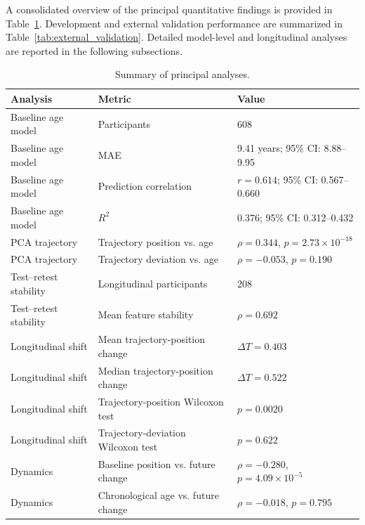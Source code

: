 \documentclass[journal]{IEEEtran}
\begin{document}
A consolidated overview of the principal quantitative findings is provided in Table~\ref{tab:main_findings}. Development and external validation performance are summarized in Table~\ref{tab:external_validation}. Detailed model-level and longitudinal analyses are reported in the following subsections.

\begin{table}[!t]
\centering
\caption{Summary of principal analyses.}
\label{tab:main_findings}
\footnotesize
\begin{tabular}{lll}
\toprule
Analysis & Metric & Value \\
\midrule
Baseline age model & Participants & 608 \\
Baseline age model & MAE & 9.41 years; 95\% CI: 8.88--9.95 \\
Baseline age model & Prediction correlation & $r=0.614$; 95\% CI: 0.567--0.660 \\
Baseline age model & $R^2$ & 0.376; 95\% CI: 0.312--0.432 \\
PCA trajectory & Trajectory position vs. age & $\rho=0.344$, $p=2.73\times10^{-18}$ \\
PCA trajectory & Trajectory deviation vs. age & $\rho=-0.053$, $p=0.190$ \\
Test--retest stability & Longitudinal participants & 208 \\
Test--retest stability & Mean feature stability & $\rho=0.692$ \\
Longitudinal shift & Mean trajectory-position change & $\Delta T=0.403$ \\
Longitudinal shift & Median trajectory-position change & $\Delta T=0.522$ \\
Longitudinal shift & Trajectory-position Wilcoxon test & $p=0.0020$ \\
Longitudinal shift & Trajectory-deviation Wilcoxon test & $p=0.622$ \\
Dynamics & Baseline position vs. future change & $\rho=-0.280$, $p=4.09\times10^{-5}$ \\
Dynamics & Chronological age vs. future change & $\rho=-0.018$, $p=0.795$ \\
\bottomrule
\end{tabular}
\end{table}
\end{document}
